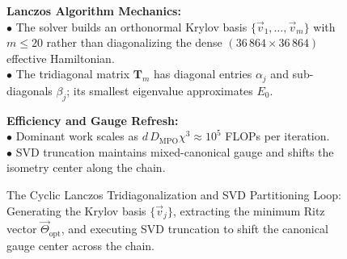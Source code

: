 \documentclass[
    12pt,
    a4paper,
    headings=normal,
    twoside=false,
    open=any,
    parskip=half
]{scrbook}
\begin{document}
\begin{figure}[htbp]
\par\vspace{2mm}
\begin{tcolorbox}[colback=white, colframe=secondarycolor!70, arc=2mm, boxrule=0.7pt, left=6pt, right=6pt, top=4pt, bottom=4pt, width=\linewidth]
\scriptsize\sffamily
\begin{minipage}[t]{0.48\textwidth}
  \textbf{\color{maincolor}Lanczos Algorithm Mechanics:}\\[1pt]
  $\bullet$ The solver builds an orthonormal Krylov basis $\{\vec{v}_1,\dots,\vec{v}_m\}$ with $m\le20$ rather than diagonalizing the dense $(36\,864\times36\,864)$ effective Hamiltonian.\\[1pt]
  $\bullet$ The tridiagonal matrix $\mathbf{T}_m$ has diagonal entries $\alpha_j$ and sub-diagonals $\beta_j$; its smallest eigenvalue approximates $E_0$.
\end{minipage}\hfill
\begin{minipage}[t]{0.48\textwidth}
  \textbf{\color{accentcolor}Efficiency and Gauge Refresh:}\\[1pt]
  $\bullet$ Dominant work scales as $d\,D_{\text{MPO}}\chi^3\approx10^5$ FLOPs per iteration.\\[1pt]
  $\bullet$ SVD truncation maintains mixed-canonical gauge and shifts the isometry center along the chain.
\end{minipage}
\end{tcolorbox}
\caption{The Cyclic Lanczos Tridiagonalization and SVD Partitioning Loop: Generating the Krylov basis $\{\vec{v}_j\}$, extracting the minimum Ritz vector $\vec{\Theta}_{\text{opt}}$, and executing SVD truncation to shift the canonical gauge center across the chain.}
\label{fig:ch4_lanczos_krylov_workflow}
\end{figure}
\end{document}
